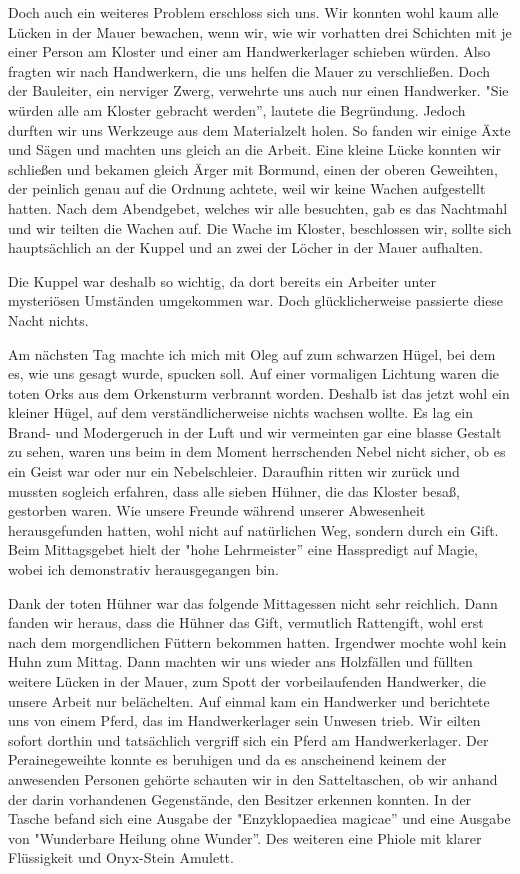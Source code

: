 Doch auch ein weiteres Problem erschloss sich uns. Wir konnten wohl kaum alle Lücken in der Mauer bewachen, wenn wir, wie wir vorhatten drei Schichten mit je einer Person am Kloster und einer am Handwerkerlager schieben würden. Also fragten wir nach Handwerkern, die uns helfen die Mauer zu verschließen. Doch der Bauleiter, ein nerviger Zwerg, verwehrte uns auch nur einen Handwerker. "Sie würden alle am Kloster gebracht werden'', lautete die Begründung. Jedoch durften wir uns Werkzeuge aus dem Materialzelt holen. So fanden wir einige Äxte und Sägen und machten uns gleich an die Arbeit. Eine kleine Lücke konnten wir schließen und bekamen gleich Ärger mit Bormund, einen der oberen Geweihten, der peinlich genau auf die Ordnung achtete, weil wir keine Wachen aufgestellt hatten. Nach dem Abendgebet, welches wir alle besuchten, gab es das Nachtmahl und wir teilten die Wachen auf. Die Wache im Kloster, beschlossen wir, sollte sich hauptsächlich an der Kuppel und an zwei der Löcher in der Mauer aufhalten.\par
Die Kuppel war deshalb so wichtig, da dort bereits ein Arbeiter unter mysteriösen Umständen umgekommen war. Doch glücklicherweise passierte diese Nacht nichts.\par
Am nächsten Tag machte ich mich mit Oleg auf zum schwarzen Hügel, bei dem es, wie uns gesagt wurde, spucken soll. Auf einer vormaligen Lichtung waren die toten Orks aus dem Orkensturm verbrannt worden. Deshalb ist das jetzt wohl ein kleiner Hügel, auf dem verständlicherweise nichts wachsen wollte. Es lag ein Brand- und Modergeruch in der Luft und wir vermeinten gar eine blasse Gestalt zu sehen, waren uns beim in dem Moment herrschenden Nebel nicht sicher, ob es ein Geist war oder nur ein Nebelschleier. Daraufhin ritten wir zurück und mussten sogleich erfahren, dass alle sieben Hühner, die das Kloster besaß, gestorben waren. Wie unsere Freunde während unserer Abwesenheit herausgefunden hatten, wohl nicht auf natürlichen Weg, sondern durch ein Gift. Beim Mittagsgebet hielt der "hohe Lehrmeister'' eine Hasspredigt auf Magie, wobei ich demonstrativ herausgegangen bin.\par

Dank der toten Hühner war das folgende Mittagessen nicht sehr reichlich. Dann fanden wir heraus, dass die Hühner das Gift, vermutlich Rattengift, wohl erst nach dem morgendlichen Füttern bekommen hatten. Irgendwer mochte wohl kein Huhn zum Mittag. Dann machten wir uns wieder ans Holzfällen und füllten weitere Lücken in der Mauer, zum Spott der vorbeilaufenden Handwerker, die unsere Arbeit nur belächelten. Auf einmal kam ein Handwerker und berichtete uns von einem Pferd, das im Handwerkerlager sein Unwesen trieb. Wir eilten sofort dorthin und tatsächlich vergriff sich ein Pferd am Handwerkerlager. Der Perainegeweihte konnte es beruhigen und da es anscheinend keinem der anwesenden Personen gehörte schauten wir in den Satteltaschen, ob wir anhand der darin vorhandenen Gegenstände, den Besitzer erkennen konnten. In der Tasche befand sich eine Ausgabe der "Enzyklopaediea magicae'' und eine Ausgabe von "Wunderbare Heilung ohne Wunder''. Des weiteren eine Phiole mit klarer Flüssigkeit und Onyx-Stein Amulett. \par

